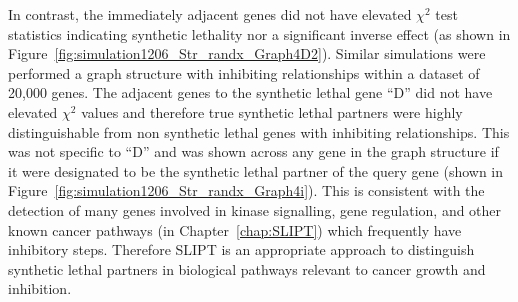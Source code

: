 In contrast, the immediately adjacent genes did not have elevated $\chi^2$ test statistics indicating synthetic lethality nor a significant inverse effect (as shown in Figure~\ref{fig:simulation1206_Str_randx_Graph4D2}). Similar simulations were performed a graph structure with inhibiting relationships within a dataset of 20,000 genes. The adjacent genes to the synthetic lethal gene ``D'' did not have elevated $\chi^2$ values and therefore true synthetic lethal partners were highly distinguishable from non synthetic lethal genes with inhibiting relationships. This was not specific to ``D'' and was shown across any gene in the graph structure if it were designated to be the synthetic lethal partner of the query gene (shown in Figure~\ref{fig:simulation1206_Str_randx_Graph4i}). This is consistent with the detection of many genes involved in kinase signalling, gene regulation, and other known cancer pathways (in Chapter~\ref{chap:SLIPT}) which frequently have inhibitory steps. Therefore \gls{SLIPT} is an appropriate approach to distinguish synthetic lethal partners in biological pathways relevant to cancer growth and inhibition.


\iffalse
\begin{figure*}[!ht]
     \begin{center}
       \subcaptionbox{Graph Structure}{%
           \raisebox{0.15\textwidth}{
           \label{fig:simulation1206_Str_randx_Graph4iD:Graph4i}
           \texttt{[image: \{"/home/tomkelly/Documents/PhD Otago Uni/SL\_Model/Graph4iD".pdf]}}
           }
        }%
       \subcaptionbox{$\chi^2$ distribution for each gene}{%
           \label{fig:simulation1206_Str_randx_Graph4iD:vioplot}
           \texttt{[image: \{"/home/tomkelly/Documents/PhD Otago Uni/SL\_Model//RUN\_20161206\_Str\_randx/SL\_Model\_Test\_Graph\_1K\_Graph4i\_ROC\_samples\_SLstry\_vioplot(4)".pdf]}}
        }%
       \end{center}
      \caption[Detection of Synthetic Lethality within an Inhibiting Graph Structure]{\small \textbf{Detection of Synthetic Lethality within an Inhibiting  Graph Structure.} The gene ``D'' was designated to be synthetic lethal and the $\chi^2$ value from \gls{SLIPT} was computed for each gene across the graph structure. The $\chi^2$ values were computed in 100 simulations of datasets of 20,000 genes including the graph structure and 1000 samples.}
\end{figure*}
\fi

